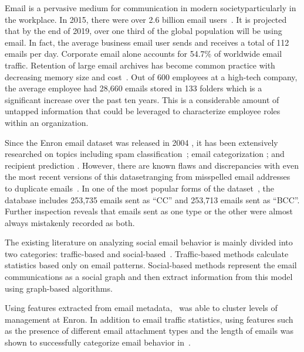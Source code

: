 \documentclass[10pt,twocolumn,conference]{IEEEtran}
\begin{document}
Email is a pervasive medium for communication in modern society\textemdash{}particularly in the workplace.  In 2015, there were over 2.6 billion email users~\cite{radicati_emails_2015}.  It is projected that by the end of 2019, over one third of the global population will be using email.  In fact, the average business email user sends and receives a total of 112 emails per day.  Corporate email alone accounts for 54.7\% of worldwide email traffic. Retention of large email archives has become common practice with decreasing memory size and cost~\cite{fisher_revisiting_2006}.  Out of 600 employees at a high-tech company, the average employee had 28,660 emails stored in 133 folders which is a significant increase over the past ten years.  This is a considerable amount of untapped information that could be leveraged to characterize employee roles within an organization.

Since the Enron email dataset was released in 2004 \cite{klimt_introducing_2004}, it has been extensively researched on topics including spam classification~\cite{martin_analyzing_2005}; email categorization \cite{he_novel_2014}; and recipient prediction \cite{sofershtein_predicting_2015}.  However, there are known flaws and discrepancies with even the most recent versions of this dataset\textemdash{}ranging from misspelled email addresses~\cite{nordbo_data_2014} to duplicate emails~\cite{waterman_big_2014}. In one of the most popular forms of the dataset~\cite{shetty_enron_2004}, the database includes 253,735 emails sent as ``CC'' and  253,713 emails sent as ``BCC''.  Further inspection reveals that emails sent as one type or the other were almost always mistakenly recorded as both.

The existing literature on analyzing social email behavior is mainly divided into two categories: traffic-based and social-based~\cite{tang_email_2013}.  Traffic-based methods calculate statistics based only on email patterns. Social-based methods represent the email communications as a social graph and then extract information from this model using graph-based algorithms.

Using features extracted from email metadata,~\cite{yelupula_social_2008} was able to cluster levels of management at Enron. In addition to email traffic statistics, using features such as the presence of different email attachment types and the length of emails was shown to successfully categorize email behavior in~\cite{martin_analyzing_2005}.
\end{document}
